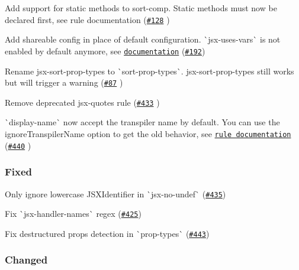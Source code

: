 \begin{DoxyItemize}
\item Add support for static methods to {\ttfamily sort-\/comp}. Static methods must now be declared first, see rule documentation (\href{https://github.com/yannickcr/eslint-plugin-react/issues/128}{\tt \#128} )
\item Add shareable config in place of default configuration. \`{}jsx-\/uses-\/vars\`{} is not enabled by default anymore, see \href{README.md#recommended-configuration}{\tt documentation} (\href{https://github.com/yannickcr/eslint-plugin-react/issues/192}{\tt \#192})
\item Rename {\ttfamily jsx-\/sort-\/prop-\/types} to \`{}sort-\/prop-\/types\`{}. {\ttfamily jsx-\/sort-\/prop-\/types} still works but will trigger a warning (\href{https://github.com/yannickcr/eslint-plugin-react/issues/87}{\tt \#87} )
\item Remove deprecated {\ttfamily jsx-\/quotes} rule (\href{https://github.com/yannickcr/eslint-plugin-react/pull/433}{\tt \#433} )
\item \`{}display-\/name\`{} now accept the transpiler name by default. You can use the {\ttfamily ignore\+Transpiler\+Name} option to get the old behavior, see \href{docs/rules/display-name.md#ignoretranspilername}{\tt rule documentation} (\href{https://github.com/yannickcr/eslint-plugin-react/pull/440}{\tt \#440} )
\end{DoxyItemize}

\subsubsection*{Fixed}


\begin{DoxyItemize}
\item Only ignore lowercase J\+S\+X\+Identifier in \`{}jsx-\/no-\/undef\`{} (\href{https://github.com/yannickcr/eslint-plugin-react/issues/435}{\tt \#435})
\item Fix \`{}jsx-\/handler-\/names\`{} regex (\href{https://github.com/yannickcr/eslint-plugin-react/issues/425}{\tt \#425})
\item Fix destructured props detection in \`{}prop-\/types\`{} (\href{https://github.com/yannickcr/eslint-plugin-react/issues/443}{\tt \#443})
\end{DoxyItemize}

\subsubsection*{Changed}



